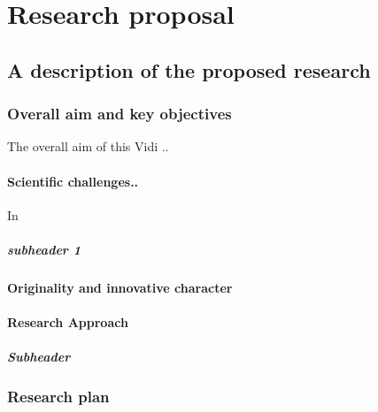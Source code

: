 \documentclass[10pt]{article}
\begin{document}
	\section{Research proposal}
	
	\subsection{A description of the proposed research}
		
	\subsubsection{Overall aim and key objectives}
	\begin{NoHyper}
	    The overall aim of this Vidi ..
	    \paragraph{Scientific challenges..\\}
		In \citep{masson-delmotteClimateChange20212021}
	    

	    \subparagraph{subheader 1\\}
	    \paragraph{Originality and innovative character\\}
	     
	   

	\paragraph{Research Approach}

	\subparagraph{Subheader\\}
	
	
	\subsubsection{Research plan}

\end{NoHyper}
\end{document}
